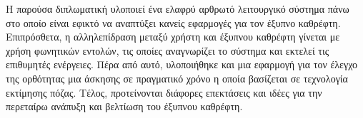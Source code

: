 Η παρούσα διπλωματική υλοποιεί ένα ελαφρύ αρθρωτό λειτουργικό σύστημα πάνω στο οποίο είναι εφικτό να αναπτύξει κανείς εφαρμογές για τον έξυπνο καθρέφτη. Επιπρόσθετα, η αλληλεπίδραση μεταξύ χρήστη και έξυπνου καθρέφτη γίνεται με χρήση φωνητικών εντολών, τις οποίες αναγνωρίζει το σύστημα και εκτελεί τις επιθυμητές ενέργειες. Πέρα από αυτό, υλοποιήθηκε και μια εφαρμογή για τον έλεγχο της ορθότητας μια άσκησης σε πραγματικό χρόνο η οποία βασίζεται σε τεχνολογία εκτίμησης πόζας. Τέλος, προτείνονται διάφορες επεκτάσεις και ιδέες για την περεταίρω ανάπυξη και βελτίωση του έξυπνου καθρέφτη.
